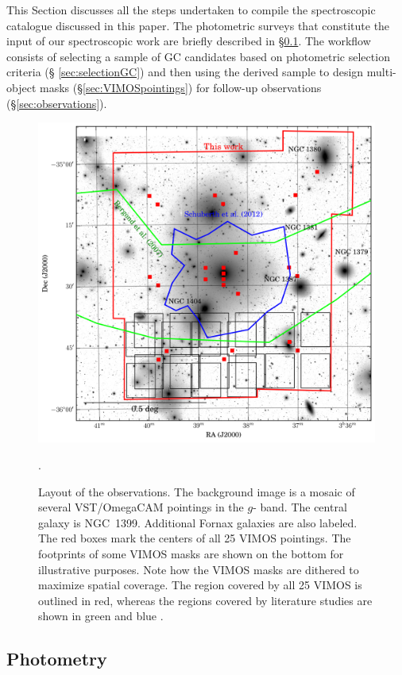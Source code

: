 \documentclass[useAMS,usenatbib]{mn2e}
\begin{document}
This Section discusses all the steps undertaken to compile the spectroscopic 
catalogue discussed in this paper. The photometric surveys that constitute the input 
of our spectroscopic work are briefly described in \S\ref{sec:phot}. The 
workflow consists of selecting a sample of GC candidates based on photometric 
selection criteria (\S 
\ref{sec:selectionGC}) and then using the derived sample to design multi-object 
masks (\S \ref{sec:VIMOSpointings}) for follow-up 
observations (\S \ref{sec:observations}).

\begin{figure}
\centering
\includegraphics[scale=0.7]{figures/fov.png} 
\caption{Layout of the observations. The background image is a mosaic of 
several VST/OmegaCAM pointings in the $g$-
band. The central galaxy is NGC~1399. Additional Fornax galaxies are also 
labeled. The red boxes mark the centers of all 
25 VIMOS pointings. The footprints of some VIMOS masks are shown on the bottom 
for illustrative purposes. Note how 
the VIMOS masks are dithered to maximize spatial coverage. The region 
covered by all 25 VIMOS is outlined in red, 
whereas the regions covered by literature studies are shown in green 
\citep{Bergond07} and blue \citep{Schuberth}.}.
\label{fig:fov}
\end{figure}

\subsection{Photometry}
\label{sec:phot}
\end{document}
